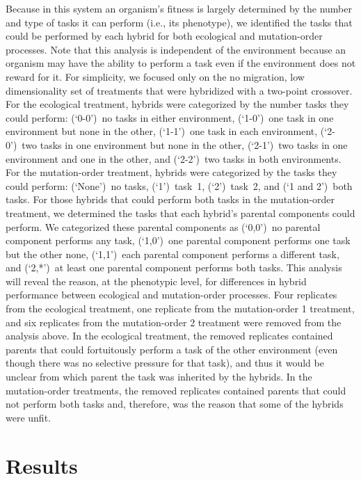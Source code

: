 \begin{doublespace}
Because in this system an organism's fitness is largely determined
by the number and type of tasks it can perform (i.e., its phenotype),
we identified the tasks that could be performed by each hybrid
for both ecological and mutation-order processes.
%
Note that this analysis is independent of the environment
because an organism may have the ability to perform a task
even if the environment does not reward for it.
%
For simplicity, we focused only on
the no migration, low dimensionality set of treatments
that were hybridized with a two-point crossover.
%
For the ecological treatment,
hybrids were categorized by the number tasks they could perform:
(`\mbox{0-0}')~no tasks in either environment,
(`\mbox{1-0}')~one task in one environment but none in the other,
(`\mbox{1-1}')~one task in each environment,
(`\mbox{2-0}')~two tasks in one environment but none in the other,
(`\mbox{2-1}')~two tasks in one environment and one in the other,
and (`\mbox{2-2}')~two tasks in both environments.
%
For the mutation-order treatment,
hybrids were categorized by the tasks they could perform:
(`None')~no tasks,
(`1')~task~1,
(`2')~task~2,
and (`1 and 2')~both tasks.
%
For those hybrids that could perform both tasks
in the mutation-order treatment,
we determined the tasks that each hybrid's parental components could perform.
%
We categorized these parental components as
(`0,0')~no parental component performs any task,
(`1,0')~one parental component performs one task but the other none,
(`1,1')~each parental component performs a different task,
and (`2,*')~at least one parental component performs both tasks.
%
This analysis will reveal the reason, at the phenotypic level,
for differences in hybrid performance between ecological
and mutation-order processes.
%
Four replicates from the ecological treatment,
one replicate from the mutation-order 1 treatment,
and six replicates from the mutation-order 2 treatment
were removed from the analysis above.
%
In the ecological treatment, the removed replicates contained parents
that could fortuitously perform a task of the other environment
(even though there was no selective pressure for that task),
and thus it would be unclear from which parent the task was inherited
by the hybrids.
%
In the mutation-order treatments, the removed replicates contained parents
that could not perform both tasks and, therefore, was the reason
that some of the hybrids were unfit.



\section{Results}


\end{doublespace}
